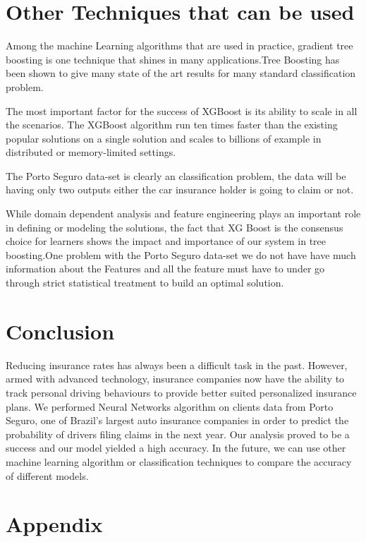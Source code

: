\section{Other Techniques that can be used}

Among the machine Learning algorithms that are used in practice, gradient tree boosting is one technique that shines in many applications.Tree Boosting has been shown to give many state of the art results for many standard classification problem.

The most important factor for the success of XGBoost is its ability to scale in all the scenarios. The XGBoost algorithm run ten times faster than the existing popular solutions on a single solution and scales to billions of example in distributed or memory-limited settings.

The Porto Seguro data-set is clearly an classification problem, the data will be having only two outputs either the car insurance holder is going to claim or not.

While domain dependent analysis and feature engineering plays an important role in defining or modeling the solutions, the fact that XG Boost is the consensus choice for learners shows the impact and importance  of our system in tree boosting.One problem with the Porto Seguro data-set we do not have have much information about the Features and all the feature must have to under go through strict statistical treatment to build an optimal solution.

\section{Conclusion}

Reducing insurance rates has always been a difficult task in the past. However, armed with advanced technology, insurance companies now have the ability to track personal driving behaviours to provide better suited personalized insurance plans. We performed Neural Networks algorithm on clients data from Porto Seguro, one of Brazil's largest auto insurance companies in order to predict the probability of drivers filing claims in the next year. Our analysis proved to be a success and our model yielded a high accuracy. In the future, we can use other machine learning algorithm or classification techniques to compare the accuracy of different models. 


\section{Appendix}

